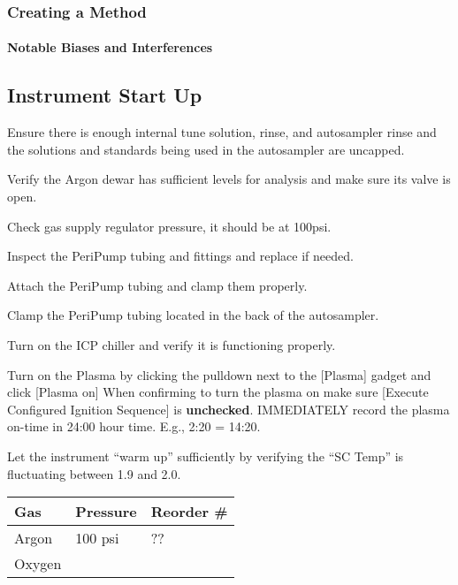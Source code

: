 \documentclass[12pt]{../SOP4_alpha}\usepackage[]{graphicx}\usepackage[]{color}
\begin{document}
\subsubsection{Creating a Method}

\paragraph{Notable Biases and Interferences}

\subsection{Instrument Start Up}

\NP Ensure there is enough internal tune solution, rinse, and autosampler rinse and the solutions and standards being used in the autosampler are uncapped.

\NP Verify the Argon dewar has sufficient levels for analysis and make sure its valve is open.

\NP Check gas supply regulator pressure, it should be at 100psi.

\NP Inspect the PeriPump tubing and fittings and replace if needed.

\NP Attach the PeriPump tubing and clamp them properly.

\NP Clamp the PeriPump tubing located in the back of the autosampler.

\NP Turn on the ICP chiller and verify it is functioning properly.

\NP Turn on the Plasma by clicking the pulldown next to the [Plasma] gadget and click [Plasma on] When confirming to turn the plasma on make sure [Execute Configured Ignition Sequence] is \textbf{unchecked}. IMMEDIATELY record the plasma on-time in 24:00 hour time. E.g., 2:20 = 14:20. 

\NP Let the instrument ``warm up'' sufficiently by verifying the ``SC Temp'' is fluctuating between 1.9 and 2.0\celsius.



\begin{table}[h]
\begin{tabular}{lll} \hline
Gas   &     Pressure    & Reorder \# \\ \hline\hline
Argon &       100 psi   & ??          \\
Oxygen&                 & \\ \hline

\end{tabular}
\end{table}
\end{document}
